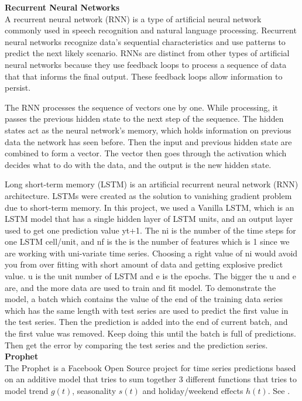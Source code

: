 \documentclass[10pt,twocolumn,letterpaper]{article}
\begin{document}
	\textbf{Recurrent Neural Networks}\\
	
	A recurrent neural network (RNN) is a type of artificial neural network commonly used in speech recognition and natural language processing. Recurrent neural networks recognize data's sequential characteristics and use patterns to predict the next likely scenario. RNNs are distinct from other types of artificial neural networks because they use feedback loops to process a sequence of data that that informs the final output. These feedback loops allow information to persist. 
	
	The RNN processes the sequence of vectors one by one. While processing, it passes the previous hidden state to the next step of the sequence. The hidden states act as the neural network’s memory, which holds information on previous data the network has seen before. Then the input and previous hidden state are combined to form a vector. The vector then goes through the activation which decides what to do with the data, and the output is the new hidden state.
	
	Long short-term memory (LSTM) is an artificial recurrent neural network (RNN) architecture. LSTMs were created as the solution to vanishing gradient problem due to short-term memory. In this project, we used a Vanilla LSTM, which is an LSTM model that has a single hidden layer of LSTM units, and an output layer used to get one prediction value yt+1. The ni is the number of the time steps for one LSTM cell/unit, and nf is the is the number of features which is 1 since we are working with uni-variate time series. Choosing a right value of ni would avoid you from over fitting with short amount of data and getting explosive predict value. u is the unit number of LSTM and e is the epochs. The bigger the u and e are, and the more data are used to train and fit model. To demonstrate the model, a batch which contains the value of the end of the training data series which has the same length with test series are used to predict the first value in the test series. Then the prediction is added into the end of current batch, and the first value was removed. Keep doing this until the batch is full of predictions. Then get the error by comparing the test series and the prediction series.\\
	
	
	\textbf{Prophet}\\
	
	The Prophet is a Facebook Open Source project for time series predictions based on an additive model that tries to sum together 3 different functions that tries to model trend $g(t)$, seasonality $s(t)$ and holiday/weekend effects $h(t)$. See \cite{taylor2018forecasting}.
	
\end{document}
